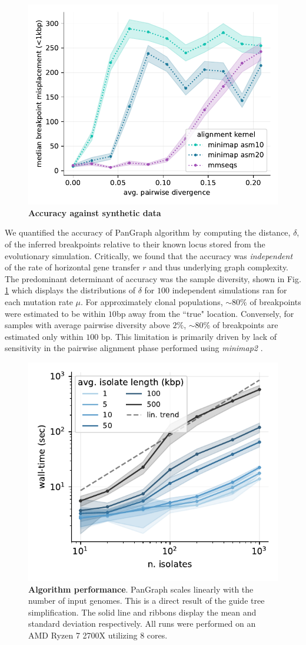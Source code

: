 \documentclass[aps,rmp,reprint,superscriptaddress,notitlepage,10pt]{revtex4-1}
\begin{document}
\begin{figure}[htb]
    \includegraphics[width=.4\textwidth]{figs/median_misplacement_vs_divergence.pdf}
    \caption{{\bf Accuracy against synthetic data}}
    \label{fig:toy-accuracy}
\end{figure}

We quantified the accuracy of PanGraph algorithm by computing the distance, $\delta$, of the inferred breakpoints relative to their known locus stored from the evolutionary simulation.
Critically, we found that the accuracy was \emph{independent} of the rate of horizontal gene transfer $r$ and thus underlying graph complexity.
The predominant determinant of accuracy was the sample diversity, shown in Fig. \ref{fig:toy-accuracy} which displays the distributions of $\delta$ for $100$ independent simulations ran for each mutation rate $\mu$.
For approximately clonal populations, $\sim 80\%$ of breakpoints were estimated to be within $10$bp away from the ``true" location.
Conversely, for samples with average pairwise diversity above $2\%$, $\sim 80\%$ of breakpoints are estimated only within $100$ bp.
This limitation is primarily driven by lack of sensitivity in the pairwise alignment phase performed using \emph{minimap2} \cite{li2018minimap2}.

\begin{figure}[htb]
    \includegraphics[width=.4\textwidth]{figs/benchmark.pdf}
    \caption{{\bf Algorithm performance}.
        PanGraph scales linearly with the number of input genomes.
        This is a direct result of the guide tree simplification.
        The solid line and ribbons display the mean and standard deviation respectively.
        All runs were performed on an AMD Ryzen 7 2700X utilizing 8 cores.
    }
    \label{fig:toy-performance}
\end{figure}
\end{document}
